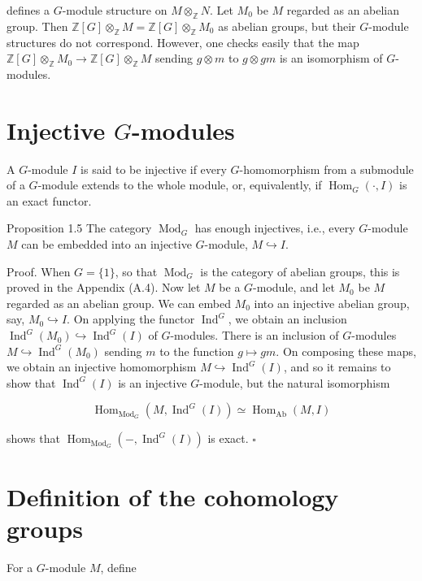 \documentclass[10pt]{article}
\begin{document}
defines a $G$-module structure on $M \otimes_{\mathbb{Z}} N$. Let $M_{0}$ be $M$ regarded as an abelian group. Then $\mathbb{Z}[G] \otimes_{\mathbb{Z}} M=\mathbb{Z}[G] \otimes_{\mathbb{Z}} M_{0}$ as abelian groups, but their $G$-module structures do not correspond. However, one checks easily that the map $\mathbb{Z}[G] \otimes_{\mathbb{Z}} M_{0} \rightarrow \mathbb{Z}[G] \otimes_{\mathbb{Z}} M$ sending $g \otimes m$ to $g \otimes g m$ is an isomorphism of $G$-modules.

\section*{Injective $G$-modules}
A $G$-module $I$ is said to be injective if every $G$-homomorphism from a submodule of a $G$-module extends to the whole module, or, equivalently, if $\operatorname{Hom}_{G}(\cdot, I)$ is an exact functor.

Proposition 1.5 The category $\operatorname{Mod}_{G}$ has enough injectives, i.e., every $G$-module $M$ can be embedded into an injective $G$-module, $M \hookrightarrow I$.

Proof. When $G=\{1\}$, so that $\operatorname{Mod}_{G}$ is the category of abelian groups, this is proved in the Appendix (A.4). Now let $M$ be a $G$-module, and let $M_{0}$ be $M$ regarded as an abelian group. We can embed $M_{0}$ into an injective abelian group, say, $M_{0} \hookrightarrow I$. On applying the functor $\operatorname{Ind}^{G}$, we obtain an inclusion $\operatorname{Ind}^{G}\left(M_{0}\right) \hookrightarrow \operatorname{Ind}^{G}(I)$ of $G$-modules. There is an inclusion of $G$-modules $M \hookrightarrow \operatorname{Ind}^{G}\left(M_{0}\right)$ sending $m$ to the function $g \mapsto g m$. On composing these maps, we obtain an injective homomorphism $M \hookrightarrow \operatorname{Ind}^{G}(I)$, and so it remains to show that $\operatorname{Ind}^{G}(I)$ is an injective $G$-module, but the natural isomorphism

$$
\operatorname{Hom}_{\operatorname{Mod}_{G}}\left(M, \operatorname{Ind}^{G}(I)\right) \simeq \operatorname{Hom}_{\mathrm{Ab}}(M, I)
$$

shows that $\operatorname{Hom}_{\operatorname{Mod}_{G}}\left(-, \operatorname{Ind}^{G}(I)\right)$ is exact. \(\square\)

\section*{Definition of the cohomology groups}
For a $G$-module $M$, define
\end{document}
